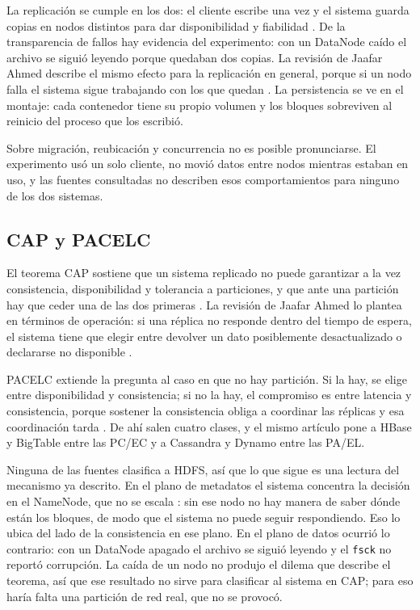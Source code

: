 \documentclass[12pt,a4paper]{article}
\begin{document}
La replicación se cumple en los dos: el cliente escribe una vez y el sistema guarda copias en nodos distintos para dar disponibilidad y fiabilidad \cite[p.~18551]{ahmed2023replication}. De la transparencia de fallos hay evidencia del experimento: con un DataNode caído el archivo se siguió leyendo porque quedaban dos copias. La revisión de Jaafar Ahmed describe el mismo efecto para la replicación en general, porque si un nodo falla el sistema sigue trabajando con los que quedan \cite[p.~172]{ahmed2023consistency}. La persistencia se ve en el montaje: cada contenedor tiene su propio volumen y los bloques sobreviven al reinicio del proceso que los escribió.

Sobre migración, reubicación y concurrencia no es posible pronunciarse. El experimento usó un solo cliente, no movió datos entre nodos mientras estaban en uso, y las fuentes consultadas no describen esos comportamientos para ninguno de los dos sistemas.

\subsection{CAP y PACELC}

El teorema CAP sostiene que un sistema replicado no puede garantizar a la vez consistencia, disponibilidad y tolerancia a particiones, y que ante una partición hay que ceder una de las dos primeras \cite[p.~1]{anagnostakis2025new}. La revisión de Jaafar Ahmed lo plantea en términos de operación: si una réplica no responde dentro del tiempo de espera, el sistema tiene que elegir entre devolver un dato posiblemente desactualizado o declararse no disponible \cite[p.~172]{ahmed2023consistency}.

PACELC extiende la pregunta al caso en que no hay partición. Si la hay, se elige entre disponibilidad y consistencia; si no la hay, el compromiso es entre latencia y consistencia, porque sostener la consistencia obliga a coordinar las réplicas y esa coordinación tarda \cite[p.~172]{ahmed2023consistency}. De ahí salen cuatro clases, y el mismo artículo pone a HBase y BigTable entre las PC/EC y a Cassandra y Dynamo entre las PA/EL.

Ninguna de las fuentes clasifica a HDFS, así que lo que sigue es una lectura del mecanismo ya descrito. En el plano de metadatos el sistema concentra la decisión en el NameNode, que no se escala \cite[p.~2830]{dhulavvagol2023performance}: sin ese nodo no hay manera de saber dónde están los bloques, de modo que el sistema no puede seguir respondiendo. Eso lo ubica del lado de la consistencia en ese plano. En el plano de datos ocurrió lo contrario: con un DataNode apagado el archivo se siguió leyendo y el \texttt{fsck} no reportó corrupción. La caída de un nodo no produjo el dilema que describe el teorema, así que ese resultado no sirve para clasificar al sistema en CAP; para eso haría falta una partición de red real, que no se provocó.
\end{document}
